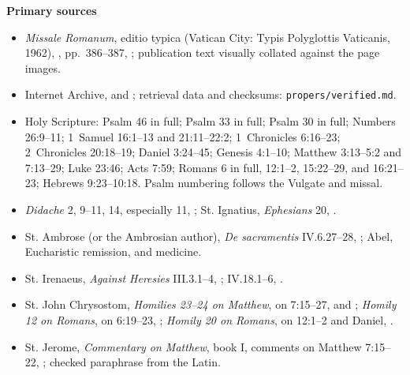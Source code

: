 \begin{deepstudy}
\textbf{Primary sources}
{\footnotesize
\begin{itemize}[itemsep=0em,topsep=0.15em,parsep=0pt]
\item \emph{Missale Romanum}, editio typica (Vatican City: Typis Polyglottis Vaticanis, 1962), , pp.~386--387, ; publication text visually collated against the page images.
\item Internet Archive,  and ; retrieval data and checksums: \texttt{propers/verified.md}.
\item Holy Scripture: Psalm 46 in full; Psalm 33 in full; Psalm 30 in full; Numbers 26:9--11; 1~Samuel 16:1--13 and 21:11--22:2; 1~Chronicles 6:16--23; 2~Chronicles 20:18--19; Daniel 3:24--45; Genesis 4:1--10; Matthew 3:13--5:2 and 7:13--29; Luke 23:46; Acts 7:59; Romans 6 in full, 12:1--2, 15:22--29, and 16:21--23; Hebrews 9:23--10:18. Psalm numbering follows the Vulgate and missal.
\item \emph{Didache} 2, 9--11, 14, especially 11, ; St. Ignatius, \emph{Ephesians} 20, .
\item St. Ambrose (or the Ambrosian author), \emph{De sacramentis} IV.6.27--28, ; Abel, Eucharistic remission, and medicine.
\item St. Irenaeus, \emph{Against Heresies} III.3.1--4, ; IV.18.1--6, .
\item St. John Chrysostom, \emph{Homilies 23--24 on Matthew}, on 7:15--27,  and ; \emph{Homily 12 on Romans}, on 6:19--23, ; \emph{Homily 20 on Romans}, on 12:1--2 and Daniel, .
\item St. Jerome, \emph{Commentary on Matthew}, book I, comments on Matthew 7:15--22, ; checked paraphrase from the Latin.

\end{itemize}}
\end{deepstudy}
